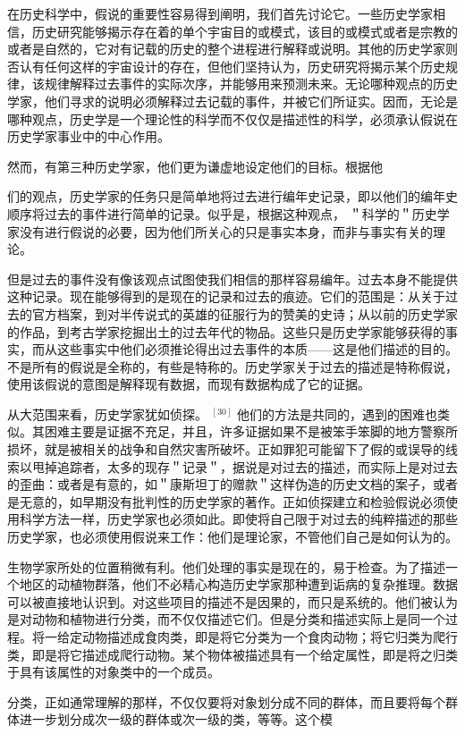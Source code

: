 在历史科学中，假说的重要性容易得到阐明，我们首先讨论它。一些历史学家相信，历史研究能够揭示存在着的单个宇宙目的或模式，该目的或模式或者是宗教的或者是自然的，它对有记载的历史的整个进程进行解释或说明。其他的历史学家则否认有任何这样的宇宙设计的存在，但他们坚持认为，历史研究将揭示某个历史规律，该规律解释过去事件的实际次序，并能够用来预测未来。无论哪种观点的历史学家，他们寻求的说明必须解释过去记载的事件，并被它们所证实。因而，无论是哪种观点，历史学是一个理论性的科学而不仅仅是描述性的科学，必须承认假说在历史学家事业中的中心作用。

然而，有第三种历史学家，他们更为谦虚地设定他们的目标。根据他

们的观点，历史学家的任务只是简单地将过去进行编年史记录，即以他们的编年史顺序将过去的事件进行简单的记录。似乎是，根据这种观点， ＂科学的＂历史学家没有进行假说的必要，因为他们所关心的只是事实本身，而非与事实有关的理论。

但是过去的事件没有像该观点试图使我们相信的那样容易编年。过去本身不能提供这种记录。现在能够得到的是现在的记录和过去的痕迹。它们的范围是：从关于过去的官方档案，到对半传说式的英雄的征服行为的赞美的史诗；从以前的历史学家的作品，到考古学家挖掘出土的过去年代的物品。这些只是历史学家能够获得的事实，而从这些事实中他们必须推论得出过去事件的本质——这是他们描述的目的。不是所有的假说是全称的，有些是特称的。历史学家关于过去的描述是特称假说，使用该假说的意图是解释现有数据，而现有数据构成了它的证据。

从大范围来看，历史学家犹如侦探。 ${ }^{[30]}$ 他们的方法是共同的，遇到的困难也类似。其困难主要是证据不充足，并且，许多证据如果不是被笨手笨脚的地方警察所损坏，就是被相关的战争和自然灾害所破坏。正如罪犯可能留下了假的或误导的线索以甩掉追踪者，太多的现存＂记录＂，据说是对过去的描述，而实际上是对过去的歪曲：或者是有意的，如＂康斯坦丁的赠款＂这样伪造的历史文档的案子，或者是无意的，如早期没有批判性的历史学家的著作。正如侦探建立和检验假说必须使用科学方法一样，历史学家也必须如此。即使将自己限于对过去的纯粹描述的那些历史学家，也必须使用假说来工作：他们是理论家，不管他们自己是如何认为的。

生物学家所处的位置稍微有利。他们处理的事实是现在的，易于检查。为了描述一个地区的动植物群落，他们不必精心构造历史学家那种遭到诟病的复杂推理。数据可以被直接地认识到。对这些项目的描述不是因果的，而只是系统的。他们被认为是对动物和植物进行分类，而不仅仅描述它们。但是分类和描述实际上是同一个过程。将一给定动物描述成食肉类，即是将它分类为一个食肉动物；将它归类为爬行类，即是将它描述成爬行动物。某个物体被描述具有一个给定属性，即是将之归类于具有该属性的对象类中的一个成员。

分类，正如通常理解的那样，不仅仅要将对象划分成不同的群体，而且要将每个群体进一步划分成次一级的群体或次一级的类，等等。这个模

